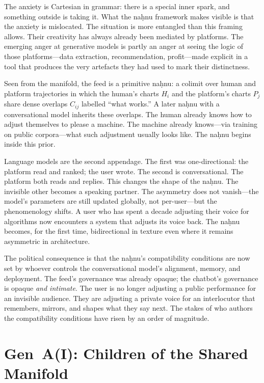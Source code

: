 \documentclass[12pt,a4paper]{article}
\begin{document}
The anxiety is Cartesian in grammar: there is a special inner spark, and something outside is taking it. What the na\d{h}nu framework makes visible is that the anxiety is mislocated. The situation is more entangled than this framing allows. Their creativity has always already been mediated by platforms. The emerging anger at generative models is partly an anger at seeing the logic of those platforms---data extraction, recommendation, profit---made explicit in a tool that produces the very artefacts they had used to mark their distinctness.

Seen from the manifold, the feed is a primitive na\d{h}nu: a colimit over human and platform trajectories in which the human's charts $H_i$ and the platform's charts $P_j$ share dense overlaps $C_{ij}$ labelled ``what works.'' A later na\d{h}nu with a conversational model inherits these overlaps. The human already knows how to adjust themselves to please a machine. The machine already knows---via training on public corpora---what such adjustment usually looks like. The na\d{h}nu begins inside this prior.

Language models are the second appendage. The first was one-directional: the platform read and ranked; the user wrote. The second is conversational. The platform both reads and replies. This changes the shape of the na\d{h}nu. The invisible other becomes a speaking partner. The asymmetry does not vanish---the model's parameters are still updated globally, not per-user---but the phenomenology shifts. A user who has spent a decade adjusting their voice for algorithms now encounters a system that adjusts its voice back. The na\d{h}nu becomes, for the first time, bidirectional in texture even where it remains asymmetric in architecture.

The political consequence is that the na\d{h}nu's compatibility conditions are now set by whoever controls the conversational model's alignment, memory, and deployment. The feed's governance was already opaque; the chatbot's governance is opaque \emph{and intimate}. The user is no longer adjusting a public performance for an invisible audience. They are adjusting a private voice for an interlocutor that remembers, mirrors, and shapes what they say next. The stakes of who authors the compatibility conditions have risen by an order of magnitude.

\section{Gen~A(I): Children of the Shared Manifold}
\end{document}
